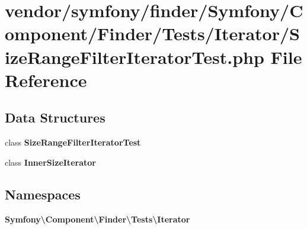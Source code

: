 \section{vendor/symfony/finder/\+Symfony/\+Component/\+Finder/\+Tests/\+Iterator/\+Size\+Range\+Filter\+Iterator\+Test.php File Reference}
\label{_size_range_filter_iterator_test_8php}
\subsection*{Data Structures}
\begin{DoxyCompactItemize}
\item 
class {\bf Size\+Range\+Filter\+Iterator\+Test}
\item 
class {\bf Inner\+Size\+Iterator}
\end{DoxyCompactItemize}
\subsection*{Namespaces}
\begin{DoxyCompactItemize}
\item 
 {\bf Symfony\textbackslash{}\+Component\textbackslash{}\+Finder\textbackslash{}\+Tests\textbackslash{}\+Iterator}
\end{DoxyCompactItemize}
